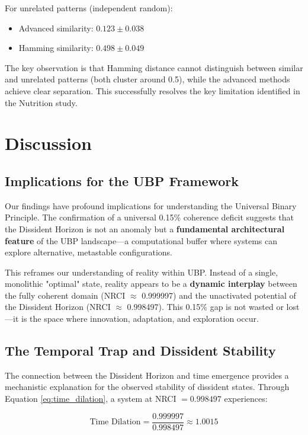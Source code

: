 \documentclass[12pt, a4paper]{article}
\begin{document}
For unrelated patterns (independent random):
\begin{itemize}
    \item Advanced similarity: $0.123 \pm 0.038$
    \item Hamming similarity: $0.498 \pm 0.049$
\end{itemize}

The key observation is that Hamming distance cannot distinguish between similar and unrelated patterns (both cluster around 0.5), while the advanced methods achieve clear separation. This successfully resolves the key limitation identified in the Nutrition study.

\section{Discussion}

\subsection{Implications for the UBP Framework}

Our findings have profound implications for understanding the Universal Binary Principle. The confirmation of a universal 0.15\% coherence deficit suggests that the Dissident Horizon is not an anomaly but a \textbf{fundamental architectural feature} of the UBP landscape—a computational buffer where systems can explore alternative, metastable configurations.

This reframes our understanding of reality within UBP. Instead of a single, monolithic "optimal" state, reality appears to be a \textbf{dynamic interplay} between the fully coherent domain (NRCI $\approx$ 0.999997) and the unactivated potential of the Dissident Horizon (NRCI $\approx$ 0.998497). This 0.15\% gap is not wasted or lost—it is the space where innovation, adaptation, and exploration occur.

\subsection{The Temporal Trap and Dissident Stability}

The connection between the Dissident Horizon and time emergence provides a mechanistic explanation for the observed stability of dissident states. Through Equation \ref{eq:time_dilation}, a system at NRCI $= 0.998497$ experiences:

\begin{equation}
\text{Time Dilation} = \frac{0.999997}{0.998497} \approx 1.0015
\end{equation}
\end{document}

